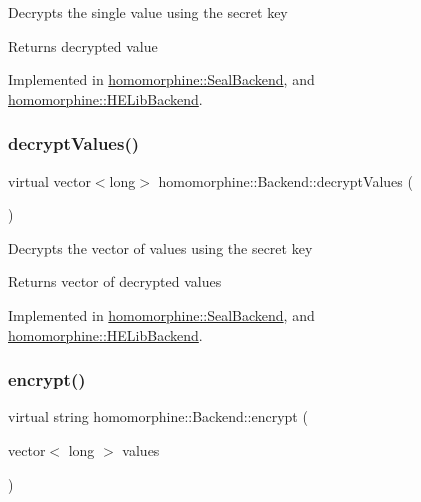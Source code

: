 Decrypts the single value using the secret key

\begin{DoxyReturn}{Returns}
decrypted value 
\end{DoxyReturn}


Implemented in \mbox{\hyperlink{classhomomorphine_1_1_seal_backend_a0496053defd79b8bd42d4d9c6b4b4ccc}{homomorphine\+::\+Seal\+Backend}}, and \mbox{\hyperlink{classhomomorphine_1_1_h_e_lib_backend_a2cd3ebc5a3332100e6cb24480262c395}{homomorphine\+::\+H\+E\+Lib\+Backend}}.

\mbox{\label{classhomomorphine_1_1_backend_a43638a85d3e1a85957f18be262c26f58}} 
\subsubsection{\texorpdfstring{decryptValues()}{decryptValues()}}
{\footnotesize\ttfamily virtual vector$<$long$>$ homomorphine\+::\+Backend\+::decrypt\+Values (\begin{DoxyParamCaption}{ }\end{DoxyParamCaption})\hspace{0.3cm}{\ttfamily [pure virtual]}}

Decrypts the vector of values using the secret key

\begin{DoxyReturn}{Returns}
vector of decrypted values 
\end{DoxyReturn}


Implemented in \mbox{\hyperlink{classhomomorphine_1_1_seal_backend_afa5f6cbb10d74c1911fcb88f722a0159}{homomorphine\+::\+Seal\+Backend}}, and \mbox{\hyperlink{classhomomorphine_1_1_h_e_lib_backend_a650d87bee6056a404f8ab81ec0f84980}{homomorphine\+::\+H\+E\+Lib\+Backend}}.

\mbox{\label{classhomomorphine_1_1_backend_ade5ea47921fae4c5117e11ed1097b7ce}} 
\subsubsection{\texorpdfstring{encrypt()}{encrypt()}\hspace{0.1cm}{\footnotesize\ttfamily [1/2]}}
{\footnotesize\ttfamily virtual string homomorphine\+::\+Backend\+::encrypt (\begin{DoxyParamCaption}\item[{vector$<$ long $>$}]{values }\end{DoxyParamCaption})\hspace{0.3cm}{\ttfamily [pure virtual]}}

